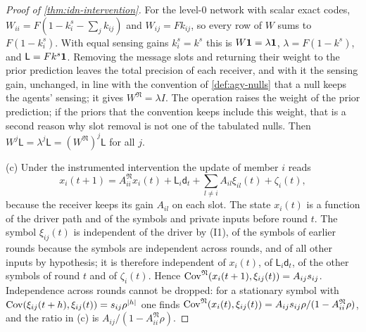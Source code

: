 \begin{proof}[Proof of \cref{thm:idn-intervention}]
For the level-0 network with scalar exact codes, $W_{ii}=F(1-k^s_i-\sum_jk_{ij})$ and $W_{ij}=Fk_{ij}$, so every row of $W$ sums to $F(1-k^s_i)$. With equal sensing gains $k^s_i=k^s$ this is $W\mathbf{1}=\lambda\mathbf{1}$, $\lambda=F(1-k^s)$, and $\mathsf L=Fk^s\mathbf{1}$. Removing the message slots and returning their weight to the prior prediction leaves the total precision of each receiver, and with it the sensing gain, unchanged, in line with the convention of \cref{def:agy-nulls} that a null keeps the agents' sensing; it gives $W^{\mathfrak N}=\lambda I$. The operation raises the weight of the prior prediction; if the priors that the convention keeps include this weight, that is a second reason why slot removal is not one of the tabulated nulls. Then $W^j\mathsf L=\lambda^j\mathsf L=(W^{\mathfrak N})^j\mathsf L$ for all $j$.

(c) Under the instrumented intervention the update of member $i$ reads
\begin{equation}\label{eq:idn-instrument}
x_i(t+1)=A^{\mathfrak N}_{ii}x_i(t)+\mathsf L_i\mathsf d_t+\sum_{l\neq i}A_{il}\xi_{il}(t)+\zeta_i(t),
\end{equation}
because the receiver keeps its gain $A_{il}$ on each slot. The state $x_i(t)$ is a function of the driver path and of the symbols and private inputs before round $t$. The symbol $\xi_{ij}(t)$ is independent of the driver by (I1), of the symbols of earlier rounds because the symbols are independent across rounds, and of all other inputs by hypothesis; it is therefore independent of $x_i(t)$, of $\mathsf L_i\mathsf d_t$, of the other symbols of round $t$ and of $\zeta_i(t)$. Hence $\operatorname{Cov}^{\mathfrak N}(x_i(t+1),\xi_{ij}(t))=A_{ij}s_{ij}$. Independence across rounds cannot be dropped: for a stationary symbol with $\operatorname{Cov}(\xi_{ij}(t+h),\xi_{ij}(t))=s_{ij}\rho^{|h|}$ one finds $\operatorname{Cov}^{\mathfrak N}(x_i(t),\xi_{ij}(t))=A_{ij}s_{ij}\rho/(1-A^{\mathfrak N}_{ii}\rho)$, and the ratio in (c) is $A_{ij}/(1-A^{\mathfrak N}_{ii}\rho)$.
\end{proof}

